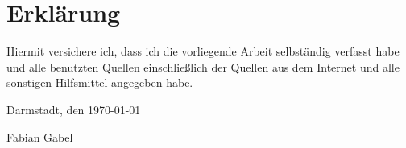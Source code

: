 \thispagestyle{empty}

\vspace*{4cm}
\section*{Erklärung}

Hiermit versichere ich, dass ich die vorliegende Arbeit selbständig verfasst habe und alle benutzten Quellen einschließlich der Quellen aus dem Internet und alle sonstigen Hilfsmittel angegeben habe.\vspace{20pt}

\noindent
Darmstadt, den \today\vspace{50pt}


\noindent
Fabian Gabel

